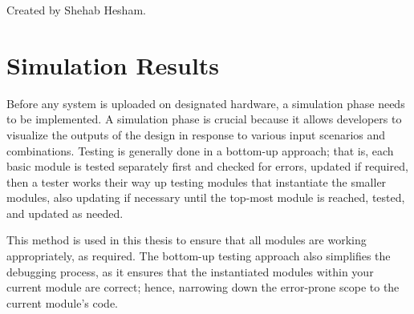 	Created by Shehab Hesham.

\section{Simulation Results}

\par Before any system is uploaded on designated hardware, a simulation phase needs to be implemented. A simulation phase is crucial because it allows developers to visualize the outputs of the design in response to various input scenarios and combinations. Testing is generally done in a bottom-up approach; that is, each basic module is tested separately first and checked for errors, updated if required, then a tester works their way up testing modules that instantiate the smaller modules, also updating if necessary until the top-most module is reached, tested, and updated as needed.  \newline
\par This method is used in this thesis to ensure that all modules are working appropriately, as required. The bottom-up testing approach also simplifies the debugging process, as it ensures that the instantiated modules within your current module are correct; hence, narrowing down the error-prone scope to the current module's code.\newline

